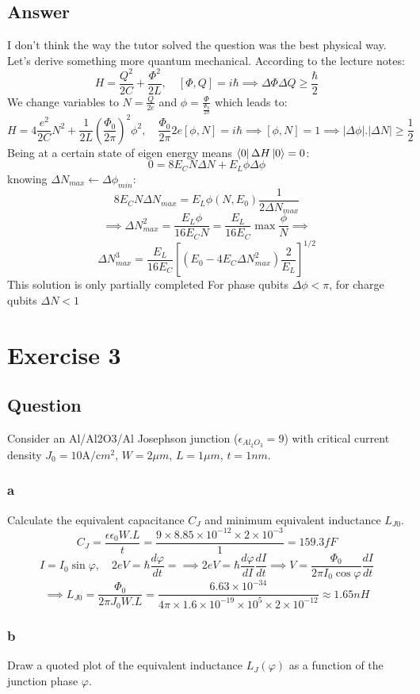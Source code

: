 \documentclass{article}
\begin{document}
\subsection{Answer}
I don't think the way the tutor solved the question was the best physical way. Let's derive something more quantum mechanical. According to the lecture notes:
$$H = \frac{Q^2}{2C} + \frac{\Phi^2}{2L},\quad [\Phi,Q] = i\hbar \implies \Delta\Phi\Delta Q \ge \frac{\hbar}{2}$$
We change variables to $N = \frac{Q}{2e}$ and $\phi = \frac{\Phi}{\frac{\Phi_0}{2\pi}}$ which leads to:
$$H = 4\frac{e^2}{2C}N^2 + \frac{1}{2L}(\frac{\Phi_0}{2\pi})^2\phi^2, \quad \frac{\Phi_0}{2\pi}2e[\phi,N] = i\hbar \implies [\phi,N] = 1 \implies |\Delta\phi|.|\Delta N| \ge \frac{1}{2}$$
Being at a certain state of eigen energy means $\bra{0}\Delta H\ket{0} = 0$:
$$0 = 8E_CN\Delta N + E_L\phi\Delta\phi$$
knowing $\Delta N_{max} \xleftarrow{} \Delta\phi_{min}$:
$$ 8E_CN\Delta N_{max} = E_L\phi(N,E_0)\frac{1}{2\Delta N_{max}}$$
$$\implies \Delta N_{max}^2 = \frac{E_L\phi}{16E_CN}=\frac{E_L}{16E_C}\max{\frac{\phi}{N}}\implies$$
$$\Delta N_{max}^3=\frac{E_L}{16E_C}[(E_0-4E_C\Delta N_{max}^2)\frac{2}{E_L}]^{1/2}$$
This solution is only partially completed
For phase qubits $\Delta\phi < \pi$, for charge qubits $\Delta N < 1$

\section{Exercise 3}
\subsection{Question}
Consider an Al/Al2O3/Al Josephson junction ($\epsilon_{Al_2O_3} = 9$) with critical current density $J_0 = 10 \text{A/c$m^2$}$, $W = 2 \mu m$, $L = 1 \mu m$, $t = 1nm$.
\subsubsection{a}
Calculate the equivalent capacitance $C_J$ and minimum equivalent inductance $L_{J0}$.
$$C_J = \frac{\epsilon \epsilon_0 W.L}{t} = \frac{9\times 8.85\times 10^{-12}\times2\times 10^{-3}}{1} = 159.3fF$$
$$I = I_0\sin{\varphi},\quad 2eV = \hbar\frac{d\varphi}{dt} = \implies 2eV = \hbar \frac{d\varphi}{dI}\frac{dI}{dt} \implies V = \frac{\Phi_0}{2\pi I_0\cos{\varphi}}\frac{dI}{dt}$$
$$\implies L_{J0} = \frac{\Phi_0}{2\pi J_0 W.L} = \frac{6.63\times 10^{-34}}{4\pi\times 1.6\times 10^{-19}\times 10^5\times 2\times 10^{-12}} \approx 1.65nH $$
\subsubsection{b}
Draw a quoted plot of the equivalent inductance $L_J(\varphi)$ as a function of the junction phase $\varphi$.  
\end{document}
